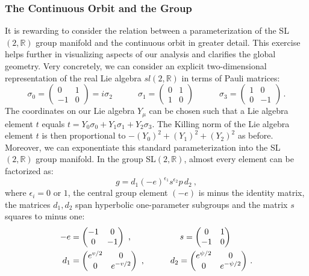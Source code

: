 \documentclass[12pt]{article}
\numberwithin{equation}{section}
\newcommand{\be}{\begin{equation}}
\newcommand{\ee}{\end{equation}}
\numberwithin{equation}{section}
\numberwithin{table}{section}\setlength{\multlinegap}{25pt}
\begin{document}
\subsubsection{The  Continuous Orbit and the Group }
\label{OrbitAndGroup}
It is rewarding to consider the relation between a parameterization of the SL$(2,\mathbb{R})$ group manifold and the continuous orbit in greater detail. This exercise helps further in visualizing aspects of our analysis and clarifies the global geometry. 
Very concretely, we can consider an explicit two-dimensional representation of the real Lie algebra $sl(2,\mathbb{R})$ in terms of Pauli matrices:
\begin{equation}
\sigma_0 = \begin{pmatrix}
0 & 1\\
-1 & 0
\end{pmatrix} = i \sigma_2
\qquad \quad
\sigma_1 = 
\begin{pmatrix}
0 & 1\\
1 & 0
\end{pmatrix}
\qquad \quad
\sigma_3 = \begin{pmatrix}
1 & 0\\
0 & -1
\end{pmatrix} \, .
\end{equation}
The coordinates on our Lie algebra $Y_\mu$ can be chosen  such that a Lie algebra element $t$ equals $t=Y_0 \sigma_0 + Y_1 \sigma_1 + Y_2 \sigma_3$. The Killing norm of the Lie algebra element $t$ is then  proportional 
to $-(Y_0)^2+(Y_1)^2+(Y_2)^2$ as before. 
Moreover, we can exponentiate this standard parameterization into the SL$(2,\mathbb{R})$ group manifold. In the group SL$(2,\mathbb{R})$, almost every element  can be factorized as:
\be
g = d_1 (-e)^{\epsilon_1} s^{\epsilon_2} p \, d_2~,
\ee
where $\epsilon_{i} = 0$ or $1$, the central group element $(-e)$ is minus the identity matrix, the matrices $d_1,d_2$ span hyperbolic one-parameter subgroups and the matrix $s$ squares to minus one:  
\begin{align}
-e &= 
\begin{pmatrix}
-1 & 0 \\
0 & -1
\end{pmatrix}
~,\qquad\hspace{1.3cm} 
s =
\begin{pmatrix}
0 & 1\\
-1 & 0
\end{pmatrix}
\nonumber \\
d_1 &= 
\begin{pmatrix}
e^{v/2}  & 0  \\
0 & e^{-v/2}
\end{pmatrix}
~, \qquad \quad
d_2 =
\begin{pmatrix}
e^{\psi/2} & 0\\ 
0 & e^{-\psi/2}
\end{pmatrix} \, .
\end{align}
\end{document}
